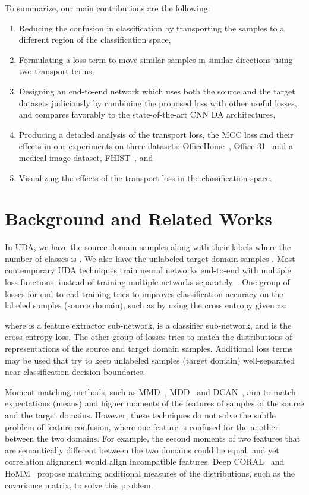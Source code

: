 \documentclass[10pt,twocolumn,letterpaper]{article}
\begin{document}
To summarize, our main contributions are the following:
\begin{enumerate}
    \item Reducing the confusion in classification by transporting the samples to a different region of the classification space,
    \item Formulating a loss term to move similar samples in similar directions using two transport terms,
    \item Designing an end-to-end network which uses both the source and the target datasets judiciously by combining the proposed loss with other useful losses, and compares favorably to the state-of-the-art CNN DA architectures,
    \item Producing a detailed analysis of the transport loss, the MCC loss \cite{mcc} and their effects in our experiments on three datasets: OfficeHome~\cite{office-home}, Office-31~\cite{office31} and a medical image dataset, FHIST~\cite{fhist}, and
    \item Visualizing the effects of the transport loss in the classification space.
\end{enumerate}





\section{Background and Related Works}

In UDA, we have the source domain samples along with their labels  where the number of classes is . We also have the unlabeled target domain samples . Most contemporary UDA techniques train neural networks end-to-end with multiple loss functions, instead of training multiple networks separately~\cite{mmd,homm,deepcoral,dcan,cdan,srdc}. One group of losses for end-to-end training tries to improves classification accuracy on the labeled samples (source domain), such as by using the cross entropy given as: 

where  is a feature extractor sub-network,  is a classifier sub-network, and  is the cross entropy loss. The other group of losses tries to match the distributions of representations of the source and target domain samples. Additional loss terms may be used that try to keep unlabeled samples (target domain) well-separated near classification decision boundaries.



Moment matching methods, such as MMD~\cite{mmd}, MDD~\cite{mdd} and DCAN~\cite{dcan}, aim to match expectations (means) and higher moments of the features of samples of the source and the target domains. However, these techniques do not solve the subtle problem of feature confusion, where one feature is confused for the another between the two domains. For example, the second moments of two features that are semantically different between the two domains could be equal, and yet correlation alignment would align incompatible features. Deep CORAL~\cite{deepcoral} and HoMM~\cite{homm} propose matching additional measures of the distributions, such as the covariance matrix, to solve this problem.
\end{document}
